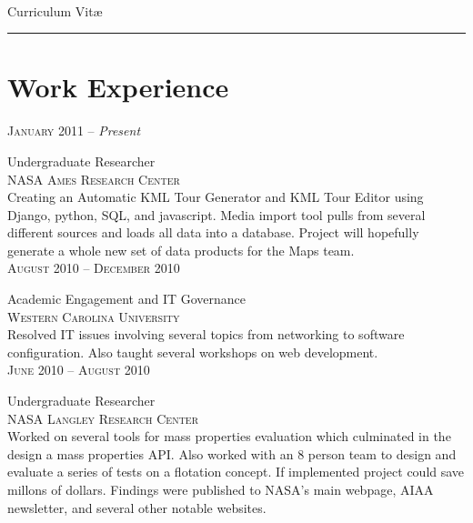 \documentclass[10pt]{article}
\begin{document}
\color{text1} %
     \par{\\
      \color{headings} Curriculum  {Vit\ae}\\[25pt]\par
      {\color{white} \hrule}} %

\begin{minipage}[t]{0.5\textwidth}

\vspace{0pt}   %

\section{Work Experience}
   \raggedleft
   \textsc{\normalsize January 2011} -- \emph{\normalsize Present}\par
   \raggedright\large Undergraduate Researcher\\
   \textsc{NASA Ames Research Center}\\
   \normalsize{Creating an Automatic KML Tour Generator and KML Tour 
   Editor using Django, python, SQL, and javascript. Media import tool
   pulls from several different sources and loads all data into a 
   database. Project will hopefully generate a whole new set of data 
   products for the Maps team.}\\[5pt]

   \raggedleft
   \textsc{\normalsize August 2010 -- December 2010}\par
   \raggedright\large Academic Engagement and IT Governance\\
   \textsc{Western Carolina University}\\
   \normalsize{Resolved IT issues involving several topics from 
   networking to software configuration. Also taught several 
   workshops on web development.}\\[5pt]

   \raggedleft
   \textsc{\normalsize June 2010 -- August 2010}\par
   \raggedright\large Undergraduate Researcher\\
   \textsc{NASA Langley Research Center}\\
   \normalsize{Worked on several tools for mass properties evaluation
   which culminated in the design a mass properties API. Also worked
   with an 8 person team to design and evaluate a series of tests on
   a flotation concept. If implemented project could save millons of
   dollars. Findings were published to NASA's main webpage, AIAA 
   newsletter, and several other notable websites.}\\[5pt]


\end{minipage}
\end{document}
